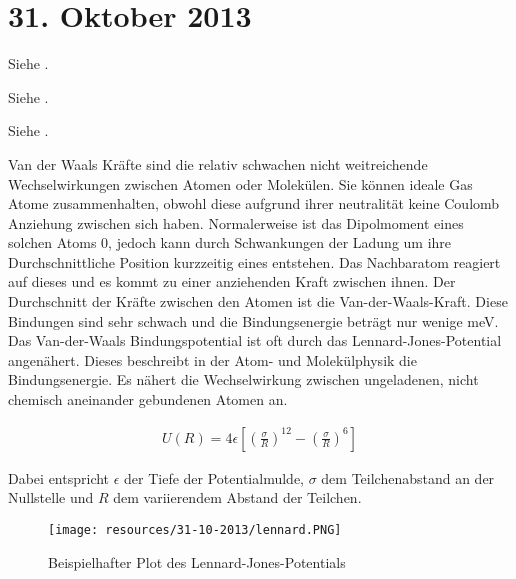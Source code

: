 \section{31. Oktober 2013}

\label{q:70}

Siehe .

\label{q:71}

Siehe .

\label{q:72}

Siehe .

\label{q:73}

Van der Waals Kräfte sind die relativ schwachen nicht weitreichende Wechselwirkungen zwischen Atomen oder Molekülen. Sie können ideale Gas Atome zusammenhalten, obwohl diese aufgrund ihrer neutralität keine Coulomb Anziehung zwischen sich haben.
Normalerweise ist das Dipolmoment eines solchen Atoms 0, jedoch kann durch Schwankungen der Ladung um ihre Durchschnittliche Position kurzzeitig eines entstehen. 
Das Nachbaratom reagiert auf dieses und es kommt zu einer anziehenden Kraft zwischen ihnen. Der Durchschnitt der Kräfte zwischen den Atomen ist die Van-der-Waals-Kraft. Diese Bindungen sind sehr schwach und die Bindungsenergie beträgt nur wenige meV.
Das Van-der-Waals Bindungspotential ist oft durch das Lennard-Jones-Potential angenähert. Dieses beschreibt in der Atom- und Molekülphysik die Bindungsenergie. Es nähert die Wechselwirkung zwischen ungeladenen, nicht chemisch aneinander gebundenen Atomen an.

\begin{align}
    U(R) = 4\epsilon\left[\left(\frac{\sigma}{R}\right)^{12} - \left(\frac{\sigma}{R}\right)^6\right]
\end{align}

Dabei entspricht $\epsilon$ der Tiefe der Potentialmulde, $\sigma$ dem Teilchenabstand an der Nullstelle und $R$ dem variierendem Abstand der Teilchen.

\begin{figure}[H]
    \texttt{[image: resources/31-10-2013/lennard.PNG]}
    \caption{Beispielhafter Plot des Lennard-Jones-Potentials}
\end{figure}

